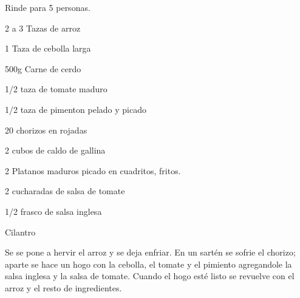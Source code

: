 
Rinde para 5 personas.\\

\begin{ingredientes}
\item 2 a 3 Tazas de arroz
\item 1 Taza de cebolla larga
\item 500g Carne de cerdo
\item 1/2 taza de tomate maduro
\item 1/2 taza de pimenton pelado y picado
\item 20 chorizos en rojadas
\item 2 cubos de caldo de gallina
\item 2 Platanos maduros picado en cuadritos, fritos.
\item 2 cucharadas de salsa de tomate
\item 1/2 frasco de salsa inglesa
\item Cilantro
\end{ingredientes}
\preparacion
Se se pone a hervir el arroz y se deja enfriar. En un sartén se sofrie el chorizo; aparte se hace un hogo con la cebolla, el tomate y el pimiento agregandole la salsa inglesa y la salsa de tomate. Cuando el hogo esté listo se revuelve con el arroz y el resto de ingredientes.